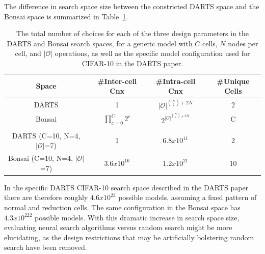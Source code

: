 The difference in search space size between the constricted DARTS space and the Bonsai space is summarized in
Table~\ref{tab:space_size_general}.
\begin{table}[h]
\begin{center}
\begin{tabular}{c|ccc}
Space & \#Inter-cell Cnx & \#Intra-cell Cnx & \#Unique Cells \\
\hline
DARTS  & 1 & $|\mathcal{O}|^{\binom{N}{2} + 2N} $ & 2 \\[.5em]
Bonsai & $\prod_{c=0}^{C}{2^c}$ & $2^{|\mathcal{O}|^{\binom{N}{2} + 2N}}$ & C \\[.1em]
	\hline  \\[-1em]
DARTS (C=10, N=4, $|\mathcal{O}|$=7)& 1 & $6.8x10^{11}$ & 2 \\[.5em]
Bonsai (C=10, N=4, $|\mathcal{O}|$=7) & $3.6x10^{16}$ & $1.2x10^{21}$ & 10
\end{tabular}
\end{center}
\caption[Search space sizes of DARTS and Bonsai]{The total number of choices for each of the three design parameters in the DARTS and Bonsai search spaces, for
a generic model with $C$ cells, $N$ nodes per cell, and $|\mathcal{O}|$ operations, as well as the specific model configuration
used for CIFAR-10 in the DARTS paper.}
\label{tab:space_size_general}
\end{table}
In the specific DARTS CIFAR-10 search space described in the DARTS paper there are therefore roughly $4.6x10^{23}$
possible models, assuming a fixed pattern of normal and reduction cells.
The same configuration in the Bonsai space has $4.3x10^{222}$ possible models. With this dramatic increase in search space
size, evaluating neural search algorithms versus random search might be more elucidating, as the design restrictions
that may be artificially bolstering random search have been removed.

